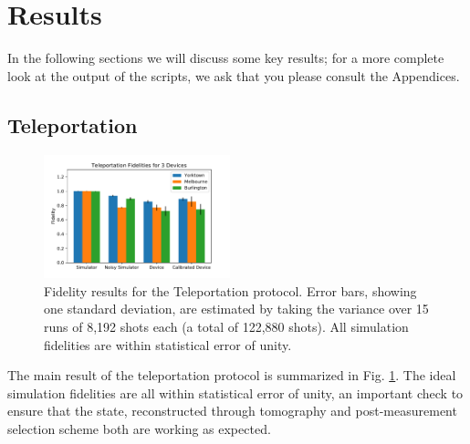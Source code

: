 \section{Results}

In the following sections we will discuss some key results;
for a more complete look at the output of the scripts, we ask that you please
consult the Appendices.

\subsection{Teleportation}

\begin{figure}[h!] \centering \includegraphics[width=0.48\textwidth]{images/results/teleport_histogram.pdf}
	\caption{Fidelity results for the Teleportation protocol. Error bars, showing
    one standard deviation, are estimated by taking the variance over 15 runs of
    8,192 shots each (a total of 122,880 shots). All simulation fidelities are
    within statistical error of unity.}
	\label{fig:teleport_histogram}
\end{figure}

The main result of the teleportation protocol is summarized in Fig.
\ref{fig:teleport_histogram}. The ideal simulation fidelities are all within
statistical error of unity, an important check to ensure that the state,
reconstructed through tomography and post-measurement selection scheme both are
working as expected.

